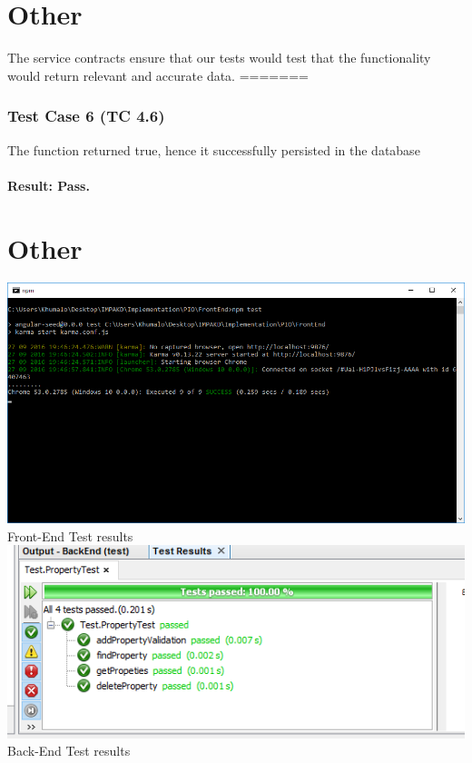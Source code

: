 \documentclass[a4paper,12pt]{article}
\begin{document}
\begin{itemize}
\section{Other}
The service contracts ensure that our tests would test that the functionality would return relevant and accurate data.
=======
\subsubsection{Test Case 6 (TC 4.6)}
The function returned true, hence it successfully persisted in the database
\paragraph{Result: Pass.}
\section{Other}
\includegraphics[width=1\textwidth]{./Images/AddPropertyKarmaTest.png}\\
Front-End Test results \\

\includegraphics[width=1\textwidth]{./Images/testResults.png}\\
Back-End Test results \\


\end{itemize}
\end{document}
